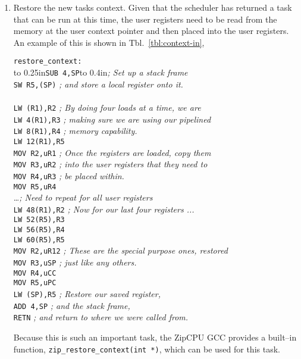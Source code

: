 \documentclass{gqtekspec}
\begin{document}
\begin{enumerate}
\item Restore the new tasks context.  Given that the scheduler has returned a
	task that can be run at this time, the user registers need to be
	read from the memory at the user context pointer and then placed into
	the user registers.  An example of this is shown in
	Tbl.~\ref{tbl:context-in},
\begin{table}\begin{center}
\begin{tabbing}
{\tt restore\_context:} \\
\hbox to 0.25in{}\= {\tt SUB 4,SP}\hbox to 0.4in{}\={\em ; Set up a stack frame} \\
\>	{\tt SW R5,(SP)} \> {\em ; and store a local register onto it.}\\
\\
\>	{\tt LW (R1),R2} \> {\em ; By doing four loads at a time, we are }\\
\>	{\tt LW 4(R1),R3} \> {\em ; making sure we are using our pipelined}\\
\>	{\tt LW 8(R1),R4} \> {\em ; memory capability. }\\
\>	{\tt LW 12(R1),R5} \\
\>	{\tt MOV R2,uR1} \> {\em ; Once the registers are loaded, copy them }\\
\>	{\tt MOV R3,uR2} \> {\em ; into the user registers that they need to}\\
\>	{\tt MOV R4,uR3} \> {\em ; be placed within.} \\
\>	{\tt MOV R5,uR4} \\
	\> \ldots {\em ; Need to repeat for all user registers} \\
\>	{\tt LW 48(R1),R2} \> {\em ; Now for our last four registers ...}\\
\>	{\tt LW 52(R5),R3} \\
\>	{\tt LW 56(R5),R4} \\
\>	{\tt LW 60(R5),R5} \\
\>	{\tt MOV R2,uR12} \> {\em ; These are the special purpose ones, restored }\\
\>	{\tt MOV R3,uSP} \> {\em ; just like any others.}\\
\>	{\tt MOV R4,uCC} \\
\>	{\tt MOV R5,uPC} \\

\>	{\tt LW (SP),R5} \> {\em ; Restore our saved register, } \\
\>	{\tt ADD 4,SP}	\> {\em ; and the stack frame, }\\
\>	{\tt RETN}	\> {\em ; and return to where we were called from.}\\
\end{tabbing}
\caption{Example Restoring User Task Context}\label{tbl:context-in}
\end{center}\end{table}
	Because this is such an important task, the ZipCPU GCC provides a
	built--in function, {\tt zip\_restore\_context(int *)}, which can be
	used for this task.  


\end{enumerate}
\end{document}
